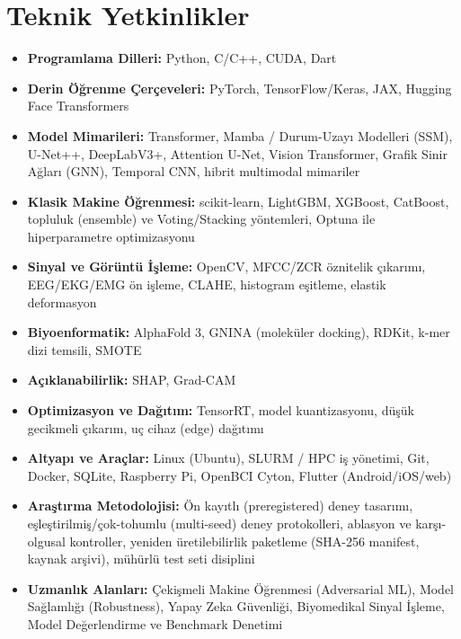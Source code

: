 \documentclass[11pt,a4paper]{article}
\begin{document}
\section*{Teknik Yetkinlikler}
\begin{itemize}
    \item \textbf{Programlama Dilleri:} Python, C/C++, CUDA, Dart
    \item \textbf{Derin Öğrenme Çerçeveleri:} PyTorch, TensorFlow/Keras, JAX, Hugging Face Transformers
    \item \textbf{Model Mimarileri:} Transformer, Mamba / Durum-Uzayı Modelleri (SSM), U-Net++, DeepLabV3+, Attention U-Net, Vision Transformer, Grafik Sinir Ağları (GNN), Temporal CNN, hibrit multimodal mimariler
    \item \textbf{Klasik Makine Öğrenmesi:} scikit-learn, LightGBM, XGBoost, CatBoost, topluluk (ensemble) ve Voting/Stacking yöntemleri, Optuna ile hiperparametre optimizasyonu
    \item \textbf{Sinyal ve Görüntü İşleme:} OpenCV, MFCC/ZCR öznitelik çıkarımı, EEG/EKG/EMG ön işleme, CLAHE, histogram eşitleme, elastik deformasyon
    \item \textbf{Biyoenformatik:} AlphaFold 3, GNINA (moleküler docking), RDKit, k-mer dizi temsili, SMOTE
    \item \textbf{Açıklanabilirlik:} SHAP, Grad-CAM
    \item \textbf{Optimizasyon ve Dağıtım:} TensorRT, model kuantizasyonu, düşük gecikmeli çıkarım, uç cihaz (edge) dağıtımı
    \item \textbf{Altyapı ve Araçlar:} Linux (Ubuntu), SLURM / HPC iş yönetimi, Git, Docker, SQLite, Raspberry Pi, OpenBCI Cyton, Flutter (Android/iOS/web)
    \item \textbf{Araştırma Metodolojisi:} Ön kayıtlı (preregistered) deney tasarımı, eşleştirilmiş/çok-tohumlu (multi-seed) deney protokolleri, ablasyon ve karşı-olgusal kontroller, yeniden üretilebilirlik paketleme (SHA-256 manifest, kaynak arşivi), mühürlü test seti disiplini
    \item \textbf{Uzmanlık Alanları:} Çekişmeli Makine Öğrenmesi (Adversarial ML), Model Sağlamlığı (Robustness), Yapay Zeka Güvenliği, Biyomedikal Sinyal İşleme, Model Değerlendirme ve Benchmark Denetimi
\end{itemize}

\end{document}
